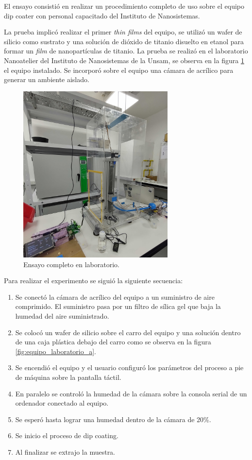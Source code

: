 El ensayo consistió en realizar un procedimiento completo de uso sobre el equipo dip coater con personal capacitado del Instituto de Nanosistemas.

La prueba implicó realizar el primer \textit{thin films} del equipo, se utilizó un wafer de silicio como sustrato y una solución de dióxido de titanio disuelto en etanol para formar un \textit{film} de nanopartículas de titanio. La prueba se realizó en el laboratorio Nanoatelier del Instituto de Nanosistemas de la Unsam, se observa en la figura \ref{fig:equipo_laboratorio} el equipo instalado. Se incorporó sobre el equipo una cámara de acrílico para generar un ambiente aislado.
\begin{figure}[h!]
\centering 
\includegraphics[width=0.7\textwidth]{./Figures/prueba_b.jpg}
\caption{Ensayo completo en laboratorio.}
\label{fig:equipo_laboratorio}
\end{figure}


Para realizar el experimento se siguió la siguiente secuencia:
\begin{enumerate}
\item Se conectó la cámara de acrílico del equipo a un suministro de aire comprimido. El suministro pasa por un filtro de sílica gel que baja la humedad del aire suministrado.
\item Se colocó un wafer de silicio sobre el carro del equipo y una solución dentro de una caja plástica debajo del carro como se observa en la figura \ref{fig:equipo_laboratorio_a}.
\item Se encendió el equipo y el usuario configuró los parámetros del proceso a pie de máquina sobre la pantalla táctil.
\item En paralelo se controló la humedad de la cámara sobre la consola serial de un ordenador conectado al equipo.
\item Se esperó hasta lograr una humedad dentro de la cámara de 20\%.
\item Se inicio el proceso de dip coating.
\item Al finalizar se extrajo la muestra.
\end{enumerate}


